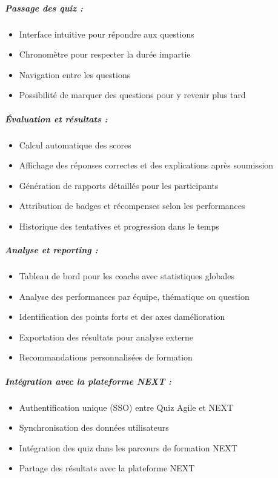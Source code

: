 \documentclass[12pt,a4paper,twoside]{report}
\begin{document}
\hypertarget{passage-des-quiz}{%
\subparagraph{Passage des quiz :}\label{passage-des-quiz}}

\begin{itemize}
\item
  Interface intuitive pour répondre aux questions
\item
  Chronomètre pour respecter la durée impartie
\item
  Navigation entre les questions
\item
  Possibilité de marquer des questions pour y revenir plus tard
\end{itemize}

\hypertarget{uxe9valuation-et-ruxe9sultats}{%
\subparagraph{Évaluation et résultats
:}\label{uxe9valuation-et-ruxe9sultats}}

\begin{itemize}
\item
  Calcul automatique des scores
\item
  Affichage des réponses correctes et des explications après soumission
\item
  Génération de rapports détaillés pour les participants
\item
  Attribution de badges et récompenses selon les performances
\item
  Historique des tentatives et progression dans le temps
\end{itemize}

\hypertarget{analyse-et-reporting}{%
\subparagraph{Analyse et reporting :}\label{analyse-et-reporting}}

\begin{itemize}
\item
  Tableau de bord pour les coachs avec statistiques globales
\item
  Analyse des performances par équipe, thématique ou question
\item
  Identification des points forts et des axes
  d\textquotesingle amélioration
\item
  Exportation des résultats pour analyse externe
\item
  Recommandations personnalisées de formation
\end{itemize}

\hypertarget{intuxe9gration-avec-la-plateforme-next}{%
\subparagraph{Intégration avec la plateforme NEXT
:}\label{intuxe9gration-avec-la-plateforme-next}}

\begin{itemize}
\item
  Authentification unique (SSO) entre Quiz Agile et NEXT
\item
  Synchronisation des données utilisateurs
\item
  Intégration des quiz dans les parcours de formation NEXT
\item
  Partage des résultats avec la plateforme NEXT
\end{itemize}
\end{document}
